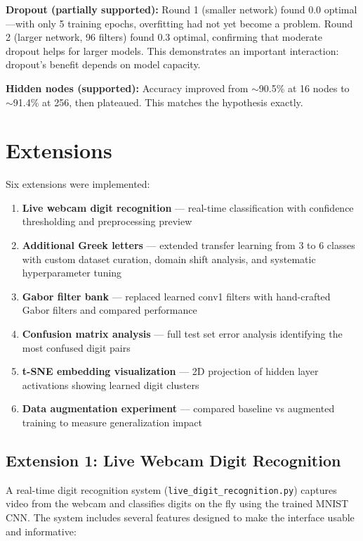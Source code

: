 \documentclass[11pt]{article}
\begin{document}
\textbf{Dropout (partially supported):} Round 1 (smaller network)
found 0.0 optimal---with only 5 training epochs, overfitting had not
yet become a problem. Round 2 (larger network, 96 filters) found 0.3
optimal, confirming that moderate dropout helps for larger models. This
demonstrates an important interaction: dropout's benefit depends on
model capacity.

\textbf{Hidden nodes (supported):} Accuracy improved from
$\sim$90.5\% at 16 nodes to $\sim$91.4\% at 256, then plateaued.
This matches the hypothesis exactly.

\section{Extensions}

Six extensions were implemented:
\begin{enumerate}
    \item \textbf{Live webcam digit recognition} --- real-time classification with confidence thresholding and preprocessing preview
    \item \textbf{Additional Greek letters} --- extended transfer learning from 3 to 6 classes with custom dataset curation, domain shift analysis, and systematic hyperparameter tuning
    \item \textbf{Gabor filter bank} --- replaced learned conv1 filters with hand-crafted Gabor filters and compared performance
    \item \textbf{Confusion matrix analysis} --- full test set error analysis identifying the most confused digit pairs
    \item \textbf{t-SNE embedding visualization} --- 2D projection of hidden layer activations showing learned digit clusters
    \item \textbf{Data augmentation experiment} --- compared baseline vs augmented training to measure generalization impact
\end{enumerate}

\subsection{Extension 1: Live Webcam Digit Recognition}

A real-time digit recognition system (\texttt{live\_digit\_recognition.py})
captures video from the webcam and classifies digits on the fly using
the trained MNIST CNN. The system includes several features designed to
make the interface usable and informative:
\end{document}
